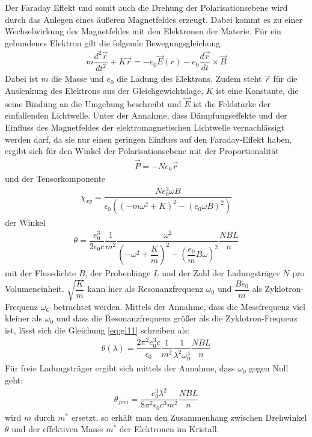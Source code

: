 Der Faraday Effekt und somit auch die Drehung der Polarisationsebene wird durch das Anlegen eines äußeren Magnetfeldes erzeugt. Dabei kommt es zu einer Wechselwirkung des Magnetfeldes mit den Elektronen der Materie. Für ein gebundenes Elektron gilt die folgende Bewegungsgleichung 
\begin{align}
m\dfrac{d^2\vec{r}}{dt^2}+K\vec{r}=-e_0\vec{E}(r)-e_0\dfrac{d\vec{r}}{dt}\times\vec{B}
\end{align}
Dabei ist $m$ die Masse und $e_0$ die Ladung des Elektrons. Zudem steht $\vec{r}$ für die Auslenkung des Elektrons aus der Gleichgewichtslage, $K$ ist eine Konstante, die seine Bindung an die Umgebung beschreibt und $\vec{E}$ ist die Feldstärke der einfallenden Lichtwelle. Unter der Annahme, dass Dämpfungseffekte und der Einfluss des Magnetfeldes der elektromagnetischen Lichtwelle vernachlässigt werden darf, da sie nur einen geringen Einfluss auf den Faraday-Effekt haben, ergibt sich für den Winkel der Polarisationsebene mit der Proportionalität 
\begin{align}
\vec{P}=-Ne_0\vec{r}
\end{align}
und der Tensorkomponente 
\begin{align}
\chi_{xy}=\dfrac{Ne_0^3\omega B}{\epsilon_0\left(\left(-m\omega^2+K\right)^2-\left(e_0\omega B\right)^2\right)}
\end{align}
der Winkel
\begin{align}
\label{eq:gl11}
\theta=\dfrac{e_0^3}{2\epsilon_0 c}\dfrac{1}{m^2}\dfrac{\omega^2}{\left(-\omega^2+\dfrac{K}{m}\right)^2 -\left(\dfrac{e_0}{m}B\omega\right)^2}  \dfrac{NBL}{n}
\end{align}
mit der Flussdichte $B$, der Probenlänge $L$ und der Zahl der Ladungsträger $N$ pro Volumeneinheit. $\sqrt{\dfrac{K}{m}}$ kann hier als Resonanzfrequenz $\omega_0$ und $\dfrac{Be_0}{m}$ als Zyklotron-Frequenz $\omega_C$ betrachtet werden. Mittels der Annahme, dass die Messfrequenz viel kleiner als $\omega_0$ und dass die Resonanzfrequenz größer als die Zyklotron-Frequenz ist, lässt sich die Gleichung \ref{eq:gl11} schreiben als:
\begin{align}
\theta(\lambda)=\dfrac{2\pi^2 e_0^3 c}{\epsilon_0}\dfrac{1}{m^2}\dfrac{1}{\lambda^2 \omega_0^4}\dfrac{NBL}{n}
\end{align}
Für freie Ladungsträger ergibt sich mittels der Annahme, dass $\omega_0$ gegen Null geht:
\begin{align}
\theta_{frei}=\dfrac{e_0^3\lambda^2}{8 \pi^2 \epsilon_0 c^3 m^2 }\dfrac{NBL}{n}
\end{align}
wird $m$ durch $m^{\ast}$ ersetzt, so erhält man den Zusammenhang zwischen Drehwinkel $\theta$ und der effektiven Masse $m^{\ast}$ der Elektronen im Kristall. 